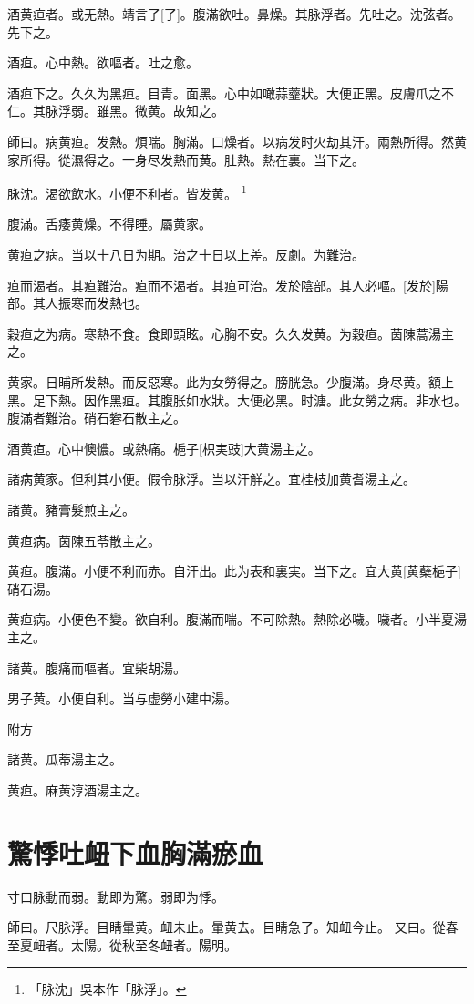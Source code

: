 \documentclass[12pt,oneside,UTF8,b5paper]{ctexbook}她她她她她她她
\begin{document}
酒黄疸者。或无熱。靖言了[了]。腹滿欲吐。鼻燥。其脉浮者。先吐之。沈弦者。先下之。

酒疸。心中熱。欲嘔者。吐之愈。

酒疸下之。久久为黑疸。目青。面黑。心中如噉蒜虀狀。大便正黑。皮膚爪之不仁。其脉浮弱。雖黑。微黄。故知之。

師曰。病黄疸。发熱。煩喘。胸滿。口燥者。以病发时火劫其汗。兩熱所得。然黄家所得。從濕得之。一身尽发熱而黄。肚熱。熱在裏。当下之。

脉沈。渴欲飲水。小便不利者。皆发黄。
	\footnote{「脉沈」吳本作「脉浮」。}

腹滿。舌痿黄燥。不得睡。屬黄家。

黄疸之病。当以十八日为期。治之十日以上差。反劇。为難治。

疸而渴者。其疸難治。疸而不渴者。其疸可治。发於陰部。其人必嘔。[发於]陽部。其人振寒而发熱也。

穀疸之为病。寒熱不食。食即頭眩。心胸不安。久久发黄。为穀疸。茵陳蒿湯主之。

黄家。日晡所发熱。而反惡寒。此为女勞得之。膀胱急。少腹滿。身尽黄。額上黑。足下熱。因作黑疸。其腹胀如水狀。大便必黑。时溏。此女勞之病。非水也。腹滿者難治。硝石礬石散主之。

酒黄疸。心中懊憹。或熱痛。梔子[枳実豉]大黄湯主之。

諸病黄家。但利其小便。假令脉浮。当以汗觧之。宜桂枝加黄耆湯主之。

諸黄。豬膏髮煎主之。

黄疸病。茵陳五苓散主之。

黄疸。腹滿。小便不利而赤。自汗出。此为表和裏実。当下之。宜大黄[黄蘗梔子]硝石湯。

黄疸病。小便色不變。欲自利。腹滿而喘。不可除熱。熱除必噦。噦者。小半夏湯主之。

諸黄。腹痛而嘔者。宜柴胡湯。

男子黄。小便自利。当与虚勞小建中湯。

附方

諸黄。瓜蒂湯主之。

黄疸。麻黄淳酒湯主之。

\chapter{驚悸吐衄下血胸滿瘀血}

寸口脉動而弱。動即为驚。弱即为悸。

師曰。尺脉浮。目睛暈黄。衄未止。暈黄去。目睛急了。知衄今止。
又曰。從春至夏衄者。太陽。從秋至冬衄者。陽明。
\end{document}
